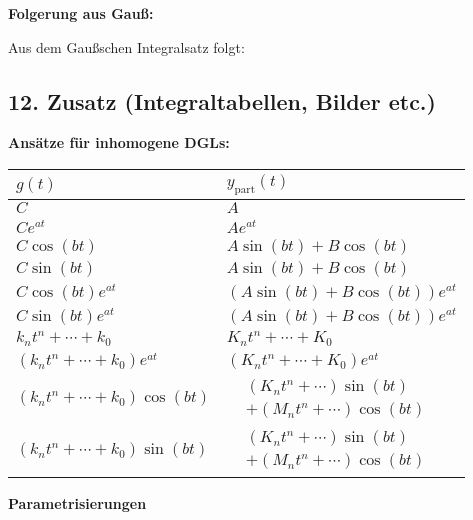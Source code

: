 \textbf{Folgerung aus Gauß:}

Aus dem Gaußschen Integralsatz folgt:


\subsection{12. Zusatz (Integraltabellen, Bilder etc.)}

\textbf{Ansätze für inhomogene DGLs:}

\begin{center}
\renewcommand{\arraystretch}{1.4}
\begin{tabular}{|
  >{\centering\arraybackslash}m{4cm}|
  >{\centering\arraybackslash}m{4cm}|
}
\hline
$g(t)$ & $y_{\text{part}}(t)$ \\
\hline
$C$ & $A$ \\
$Ce^{at}$ & $Ae^{at}$ \\
$C\cos(bt)$ & $A\sin(bt) + B\cos(bt)$ \\
$C\sin(bt)$ & $A\sin(bt) + B\cos(bt)$ \\
$C\cos(bt)e^{at}$ & $(A\sin(bt) + B\cos(bt))e^{at}$ \\
$C\sin(bt)e^{at}$ & $(A\sin(bt) + B\cos(bt))e^{at}$ \\
$k_nt^n + \cdots + k_0$ & $K_nt^n + \cdots + K_0$ \\
$(k_nt^n + \cdots + k_0)e^{at}$ & $(K_nt^n + \cdots + K_0)e^{at}$ \\
$(k_nt^n + \cdots + k_0)\cos(bt)$ &
$\begin{aligned}
&(K_nt^n + \cdots)\sin(bt)\\
&+ (M_nt^n + \cdots)\cos(bt)
\end{aligned}$ \\
$(k_nt^n + \cdots + k_0)\sin(bt)$ &
$\begin{aligned}
&(K_nt^n + \cdots)\sin(bt)\\
&+ (M_nt^n + \cdots)\cos(bt)
\end{aligned}$ \\
\hline
\end{tabular}
\end{center}


\textbf{Parametrisierungen}

\vspace{0.5em}

